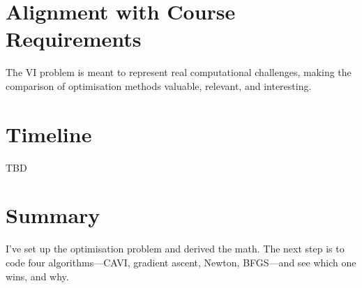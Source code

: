 \documentclass[11pt]{article}
\begin{document}
\section*{Alignment with Course Requirements}

  

 The VI problem is meant to represent  real computational challenges, making the comparison of optimisation methods   valuable,  relevant, and interesting.

\section*{Timeline}

TBD

\section*{Summary}

I've set up the optimisation problem and derived the math. The next step is to code four algorithms---CAVI, gradient ascent, Newton, BFGS---and see which one wins, and why.
\end{document}
